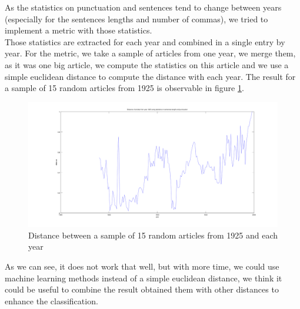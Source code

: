 As the statistics on punctuation and sentences tend to change between years (especially for the sentences lengths and number of commas), we tried to implement a metric with those statistics. \\

Those statistics are extracted for each year and combined in a single entry by year. For the metric, we take a sample of articles from one year, we merge them, as it was one big article, we compute the statistics on this article and we use a simple euclidean distance to compute the distance with each year. The result for a sample of 15 random articles from 1925 is observable in figure \ref{punct_metric_1925}.

\begin{figure}[h!]
	\centering
    \includegraphics[scale=0.15]{Pictures/date_articles/punctuation/graph.png}
    \caption{Distance between a sample of 15 random articles from 1925 and each year}
    \label{punct_metric_1925}\hfill
\end{figure}

As we can see, it does not work that well, but with more time, we could use machine learning methods instead of a simple euclidean distance, we think it could be useful to combine the result obtained them with other distances to enhance the classification.
